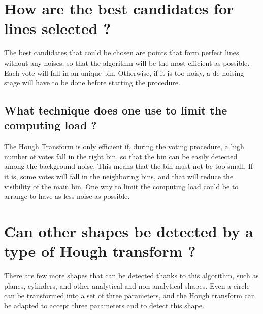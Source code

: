 \documentclass[twoside]{article}
\begin{document}
\section{How are the best candidates for lines selected ?}
The best candidates that could be chosen are points that form perfect lines without any noises, so that the algorithm will be the most efficient as possible.
Each vote will fall in an unique bin.
Otherwise, if it is too noisy, a de-noising stage will have to be done before starting the procedure.

\subsection{What technique does one use to limit the computing load ?}
The Hough Transform is only efficient if, during the voting procedure, a high number of votes fall in the right bin, so that the bin can be easily detected among the background noise. 
This means that the bin must not be too small. If it is, some votes will fall in the neighboring bins, and that will reduce the visibility of the main bin.
One way to limit the computing load could be to arrange to have as less noise as possible.

\section{Can other shapes be detected by a type of Hough transform ?}
There are few more shapes that can be detected thanks to this algorithm, such as planes, cylinders, and other analytical and non-analytical shapes.
Even a circle can be transformed into a set of three parameters, and the Hough transform can be adapted to accept three parameters and to detect this shape.
\end{document}
